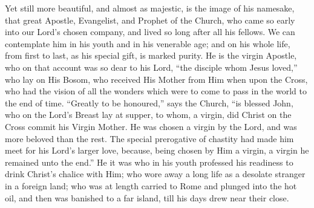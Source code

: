 Yet still more beautiful, and almost as majestic, is the image of
his namesake, that great Apostle, Evangelist, and Prophet of the
Church, who came so early into our Lord's chosen company, and lived so
long after all his fellows. We can contemplate him in his youth and in
his venerable age; and on his whole life, from first to last, as his
special gift, is marked purity. He is the virgin Apostle, who on that
account was so dear to his Lord, ``the disciple whom Jesus
loved,'' who lay on His Bosom, who received His Mother from Him
when upon the Cross, who had the vision of all the wonders which were
to come to pass in the world to the end of time. ``Greatly to be
honoured,'' says the Church, ``is blessed John, who on the
Lord's Breast lay at supper, to whom, a virgin, did Christ on the
Cross commit his Virgin Mother. He was chosen a virgin by the Lord,
and was more beloved than the rest. The special prerogative of
chastity had made him meet for his Lord's larger love, because, being
chosen by Him a virgin, a virgin he remained unto the end.'' He it
was who in his youth professed his readiness to drink Christ's chalice
with Him; who wore away a long life as a desolate stranger in a
foreign land; who was at length carried to Rome and plunged into the
hot oil, and then was banished to a far island, till his days drew
near their close.

